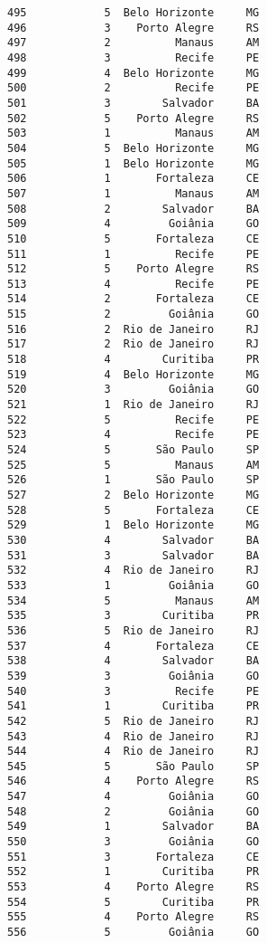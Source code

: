 \documentclass[11pt]{article}
\begin{document}
\begin{Verbatim}[commandchars=\\\{\}]
495            5  Belo Horizonte     MG  
496            3    Porto Alegre     RS  
497            2          Manaus     AM  
498            3          Recife     PE  
499            4  Belo Horizonte     MG  
500            2          Recife     PE  
501            3        Salvador     BA  
502            5    Porto Alegre     RS  
503            1          Manaus     AM  
504            5  Belo Horizonte     MG  
505            1  Belo Horizonte     MG  
506            1       Fortaleza     CE  
507            1          Manaus     AM  
508            2        Salvador     BA  
509            4         Goiânia     GO  
510            5       Fortaleza     CE  
511            1          Recife     PE  
512            5    Porto Alegre     RS  
513            4          Recife     PE  
514            2       Fortaleza     CE  
515            2         Goiânia     GO  
516            2  Rio de Janeiro     RJ  
517            2  Rio de Janeiro     RJ  
518            4        Curitiba     PR  
519            4  Belo Horizonte     MG  
520            3         Goiânia     GO  
521            1  Rio de Janeiro     RJ  
522            5          Recife     PE  
523            4          Recife     PE  
524            5       São Paulo     SP  
525            5          Manaus     AM  
526            1       São Paulo     SP  
527            2  Belo Horizonte     MG  
528            5       Fortaleza     CE  
529            1  Belo Horizonte     MG  
530            4        Salvador     BA  
531            3        Salvador     BA  
532            4  Rio de Janeiro     RJ  
533            1         Goiânia     GO  
534            5          Manaus     AM  
535            3        Curitiba     PR  
536            5  Rio de Janeiro     RJ  
537            4       Fortaleza     CE  
538            4        Salvador     BA  
539            3         Goiânia     GO  
540            3          Recife     PE  
541            1        Curitiba     PR  
542            5  Rio de Janeiro     RJ  
543            4  Rio de Janeiro     RJ  
544            4  Rio de Janeiro     RJ  
545            5       São Paulo     SP  
546            4    Porto Alegre     RS  
547            4         Goiânia     GO  
548            2         Goiânia     GO  
549            1        Salvador     BA  
550            3         Goiânia     GO  
551            3       Fortaleza     CE  
552            1        Curitiba     PR  
553            4    Porto Alegre     RS  
554            5        Curitiba     PR  
555            4    Porto Alegre     RS  
556            5         Goiânia     GO  

\end{Verbatim}
\end{document}
